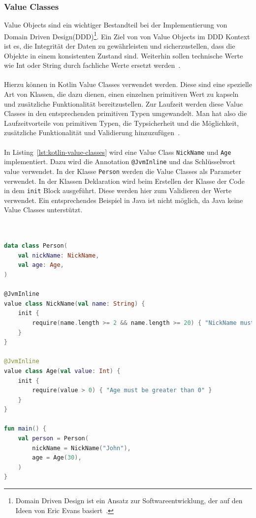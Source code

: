 \documentclass[11pt]{article}
\begin{document}
    \subsubsection{Value Classes}
    Value Objects sind ein wichtiger Bestandteil bei der Implementierung von Domain Driven Design(DDD)\footnote{Domain Driven Design ist ein Ansatz zur Softwareentwicklung, der auf den Ideen von Eric Evans basiert~\cite{evans-ddd}.}.
    Ein Ziel von von Value Objects im DDD Kontext ist es, die Integrität der Daten zu gewährleisten und sicherzustellen, dass die Objekte in einem konsistenten Zustand sind.
    Weiterhin sollen technische Werte wie Int oder String durch fachliche Werte ersetzt werden~\cite[219]{red-book}.\\
    \\
    Hierzu können in Kotlin Value Classes verwendet werden.
    Diese sind eine spezielle Art von Klassen, die dazu dienen, einen einzelnen primitiven Wert zu kapseln und zusätzliche Funktionalität bereitzustellen.
    Zur Laufzeit werden diese Value Classes in den entsprechenden primitiven Typen umgewandelt.
    Man hat also die Laufzeitvorteile von primitiven Typen, die Typsicherheit und die Möglichkeit, zusätzliche Funktionalität und Validierung hinzuzufügen~\cite{kotlin-value-classes}.\\
    \\
    In Listing~\ref{lst:kotlin-value-classes} wird eine Value Class \texttt{NickName} und \texttt{Age} implementiert.
    Dazu wird die Annotation \texttt{@JvmInline} und das Schlüsselwort value verwendet.
    In der Klasse \texttt{Person} werden die Value Classes als Parameter verwendet.
    In der Klassen Deklaration wird beim Erstellen der Klasse der Code in dem \texttt{init} Block ausgeführt.
    Diese werden hier zum Validieren der Werte verwendet.
    Ein entsprechendes Beispiel in Java ist nicht möglich, da Java keine Value Classes unterstützt.\\
    \\

    \begin{lstlisting}[language=Kotlin, caption={ValueClasses.kt}, label={lst:kotlin-value-classes}]

data class Person(
    val nickName: NickName,
    val age: Age,
)

@JvmInline
value class NickName(val name: String) {
    init {
        require(name.length >= 2 && name.length >= 20) { "NickName must be between 2 and 20 Letters" }
    }
}

@JvmInline
value class Age(val value: Int) {
    init {
        require(value > 0) { "Age must be greater than 0" }
    }
}

fun main() {
    val person = Person(
        nickName = NickName("John"),
        age = Age(30),
    )
}
    \end{lstlisting}
        
\end{document}
